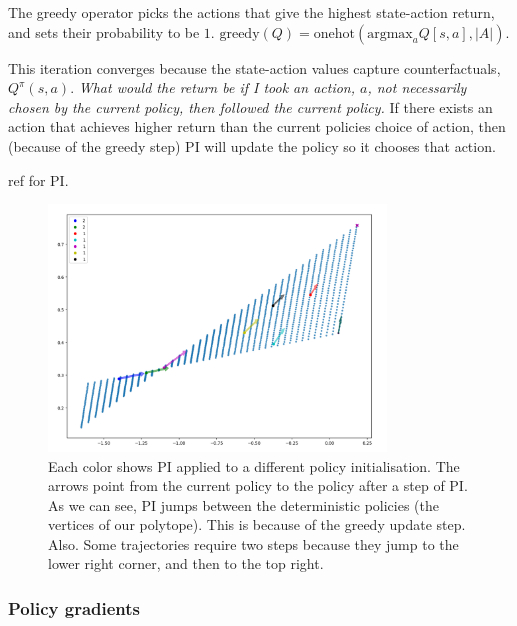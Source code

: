 The greedy operator picks the actions that give the highest state-action return,
and sets their probability to be $1$.
$\text{greedy}(Q) = \text{onehot}(\text{argmax}_a Q[s, a], |A|)$.

This iteration converges because the state-action values capture counterfactuals, $Q^{\pi}(s, a)$.
\textit{What would the return be if I took an action, $a$, not necessarily chosen by
the current policy, then followed the current policy.}
If there exists an action that achieves higher return than the current policies choice of action,
then (because of the greedy step) PI will update the policy so it chooses that action.

\footnotemark[7]


{\color{red}ref for PI.}

\begin{figure}[h!]
\centering
\includegraphics[width=0.8\textwidth,height=0.4\textheight]{../../pictures/figures/pi-polytope.png}
\caption{Each color shows PI applied to a different policy initialisation.
The arrows point from the current policy to the policy after a step of PI. As we can see,
PI jumps between the deterministic policies (the vertices of our polytope).
This is because of the greedy update step. Also. Some trajectories require two steps
because they jump to the lower right corner, and then to the top right.}
\end{figure}

\newpage

\subsubsection{Policy gradients}

